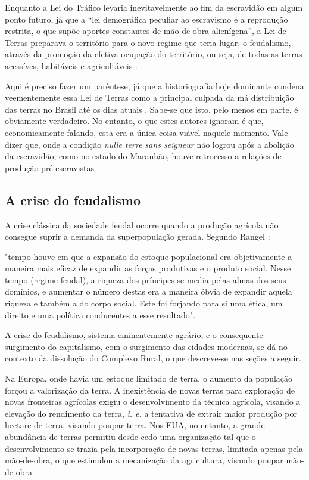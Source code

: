 \documentclass[
	12pt,				%
	oneside,			%
	a4paper,			%
	chapter=TITLE,		%
	section=TITLE,		%
	english,			%
	brazil				%
	]{abntex2}
\begin{document}
\begin{refsection}
Enquanto a Lei do Tráfico levaria inevitavelmente ao fim da escravidão em algum
ponto futuro, já que a ``lei demográfica peculiar ao escravismo é a reprodução
restrita, o que supõe aportes constantes de mão de obra alienígena'', a Lei de
Terras preparava o território para o novo regime que teria lugar, o feudalismo,
através da promoção da efetiva ocupação do território, ou seja, de todas as
terras acessíves, habitáveis e agricultáveis \autocite[732-733]{rangel1989}.

Aqui é preciso fazer um parêntese, já que a historiografia hoje dominante
condena veementemente essa Lei de Terras como a principal culpada da má
distribuição das terras no Brasil até os dias atuais \autocite[ver][
p.~47-48]{accioly2018}. Sabe-se que isto, pelo menos em parte, é obviamente verdadeiro. No
entanto, o que estes autores ignoram é que, economicamente falando, esta era a
única coisa viável naquele momento. Vale dizer que, onde a condição \emph{nulle terre
sans seigneur} não logrou após a abolição da escravidão, como no estado do
Maranhão, houve retrocesso a relações de produção pré-escravistas \autocite[
733-734]{rangel1989}.

\hypertarget{a-crise-do-feudalismo}{%
\subsection{A crise do feudalismo}\label{a-crise-do-feudalismo}}

A crise clássica da sociedade feudal ocorre quando a produção agrícola não
consegue suprir a demanda da superpopulação gerada. Segundo Rangel
\autocite*[219]{rangel1961}:
\begin{citacao} 
"tempo houve em que a expansão do estoque populacional era objetivamente a
maneira mais eficaz de expandir as forças produtivas e o produto social. Nesse
tempo (regime feudal), a riqueza dos príncipes se media pelas almas dos seus
domínios, e aumentar o número destas era a maneira óbvia de expandir aquela
riqueza e também a do corpo social. Este foi forjando para si uma ética, um
direito e uma política conducentes a esse resultado".
\end{citacao}
A crise do feudalismo, sistema eminentemente agrário, e o consequente surgimento
do capitalismo, com o surgimento das cidades modernas, se dá no contexto da
dissolução do Complexo Rural, o que descreve-se nas seções a seguir.

Na Europa, onde havia um estoque limitado de terra, o aumento da população
forçou a valorização da terra. A inexistência de novas terras para exploração de
novas fronteiras agrícolas exigiu o desenvolvimento da técnica agrícola, visando
a elevação do rendimento da terra, \emph{i. e.} a tentativa de extrair maior
produção por hectare de terra, visando poupar terra. Nos \gls{EUA}, no entanto,
a grande abundância de terras permitiu desde cedo uma organização tal que o
desenvolvimento se trazia pela incorporação de novas terras, limitada apenas
pela mão-de-obra, o que estimulou a mecanização da agricultura, visando poupar
mão-de-obra \autocite[p.227]{furtado2009}.


\end{refsection}
\end{document}
